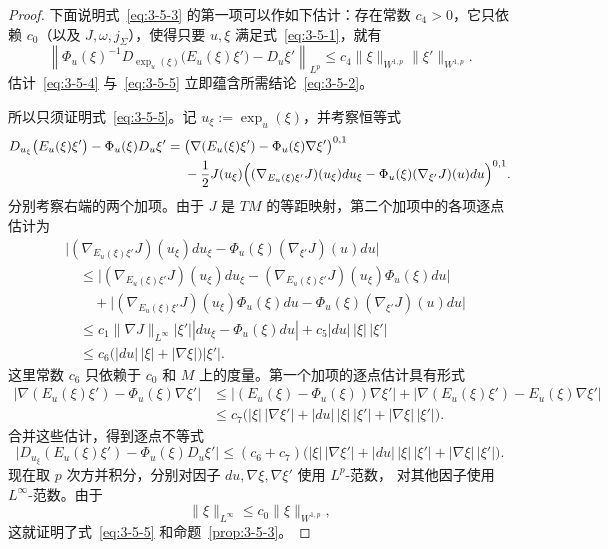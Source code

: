 \begin{proof}
下面说明式~\eqref{eq:3-5-3} 的第一项可以作如下估计：存在常数 $c_4>0$，它只依赖
$c_0$（以及 $J,\omega,j_\Sigma$），使得只要 $u,\xi$ 满足式~\eqref{eq:3-5-1}，就有
\begin{equation}\label{eq:3-5-5}
  \left\lVert
  \Phi_u(\xi)^{-1}D_{\exp_u(\xi)}\bigl(E_u(\xi)\xi'\bigr)-D_u\xi'
  \right\rVert_{L^p}
  \le c_4\lVert\xi\rVert_{W^{1,p}}
  \lVert\xi'\rVert_{W^{1,p}}.
\end{equation}
估计~\eqref{eq:3-5-4} 与~\eqref{eq:3-5-5} 立即蕴含所需结论~\eqref{eq:3-5-2}。

所以只须证明式~\eqref{eq:3-5-5}。记
$u_\xi:=\exp_u(\xi)$，并考察恒等式
\begin{align*}
  D_{u_\xi}\bigl(E_u(\xi)\xi'\bigr)-\Phi_u(\xi)D_u\xi'
  ={}&\bigl(\nabla(E_u(\xi)\xi')-
  \Phi_u(\xi)\nabla\xi'\bigr)^{0,1}\\
  &-\frac12J(u_\xi)
  \Bigl(
    (\nabla_{E_u(\xi)\xi'}J)(u_\xi)du_\xi
    -\Phi_u(\xi)(\nabla_{\xi'}J)(u)du
  \Bigr)^{0,1}.
\end{align*}
分别考察右端的两个加项。由于 $J$ 是 $TM$ 的等距映射，第二个加项中的各项逐点估计为
\begin{align*}
  &\bigl|
  (\nabla_{E_u(\xi)\xi'}J)(u_\xi)du_\xi
  -\Phi_u(\xi)(\nabla_{\xi'}J)(u)du
  \bigr|\\
  &\quad\le
  \bigl|
  (\nabla_{E_u(\xi)\xi'}J)(u_\xi)du_\xi
  -(\nabla_{E_u(\xi)\xi'}J)(u_\xi)\Phi_u(\xi)du
  \bigr|\\
  &\qquad+
  \bigl|
  (\nabla_{E_u(\xi)\xi'}J)(u_\xi)\Phi_u(\xi)du
  -\Phi_u(\xi)(\nabla_{\xi'}J)(u)du
  \bigr|\\
  &\quad\le
  c_1\lVert\nabla J\rVert_{L^\infty}|\xi'|
  |du_\xi-\Phi_u(\xi)du|
  +c_5|du|\,|\xi|\,|\xi'|\\
  &\quad\le c_6\bigl(|du|\,|\xi|+|\nabla\xi|\bigr)|\xi'|.
\end{align*}
这里常数 $c_6$ 只依赖于 $c_0$ 和 $M$ 上的度量。第一个加项的逐点估计具有形式
\begin{align*}
  \bigl|\nabla(E_u(\xi)\xi')-\Phi_u(\xi)\nabla\xi'\bigr|
  &\le
  \bigl|(E_u(\xi)-\Phi_u(\xi))\nabla\xi'\bigr|
  +\bigl|\nabla(E_u(\xi)\xi')-E_u(\xi)\nabla\xi'\bigr|\\
  &\le c_7\bigl(
  |\xi|\,|\nabla\xi'|+|du|\,|\xi|\,|\xi'|
  +|\nabla\xi|\,|\xi'|\bigr).
\end{align*}
合并这些估计，得到逐点不等式
\[
  \bigl|D_{u_\xi}(E_u(\xi)\xi')-\Phi_u(\xi)D_u\xi'\bigr|
  \le(c_6+c_7)\bigl(
  |\xi|\,|\nabla\xi'|+|du|\,|\xi|\,|\xi'|
  +|\nabla\xi|\,|\xi'|\bigr).
\]
现在取 $p$ 次方并积分，分别对因子 $du,\nabla\xi,\nabla\xi'$ 使用 $L^p$-范数，
对其他因子使用 $L^\infty$-范数。由于
\[
  \lVert\xi\rVert_{L^\infty}
  \le c_0\lVert\xi\rVert_{W^{1,p}},
\]
这就证明了式~\eqref{eq:3-5-5} 和命题~\ref{prop:3-5-3}。
\end{proof}

